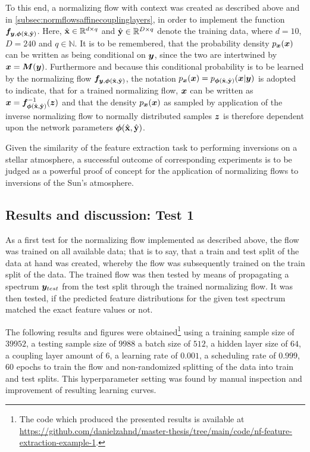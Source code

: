 \documentclass[a4paper,12pt]{report}
\begin{document}
To this end, a normalizing flow with context was created as described above and in \cref{subsec:normflowsaffinecouplinglayers}, in order to implement the function $\bm{f}_{\bm{y},\bm{\phi}(\hat{\boldsymbol{\mathbf{x}}},\hat{\boldsymbol{\mathbf{y}}})}$. Here, $\hat{\boldsymbol{\mathbf{x}}} \in \mathbb{R}^{d\times q}$ and $\hat{\boldsymbol{\mathbf{y}}} \in \mathbb{R}^{D\times q}$ denote the training data, where $d=10$, $D = 240$ and $q \in \mathbb{N}$. It is to be remembered, that the probability density $p_{\bm{x}}(\bm{x})$ can be written as being conditional on $\bm{y}$, since the two are intertwined by $\bm{x} = \bm{M}(\bm{y})$. Furthermore and because this conditional probability is to be learned by the normalizing flow $\bm{f}_{\bm{y},\bm{\phi}(\hat{\boldsymbol{\mathbf{x}}},\hat{\boldsymbol{\mathbf{y}}})}$, the notation $p_{\bm{x}}(\bm{x}) = p_{\bm{\phi}(\hat{\boldsymbol{\mathbf{x}}},\hat{\boldsymbol{\mathbf{y}}})}(\bm{x}|\bm{y})$ is adopted to indicate, that for a trained normalizing flow, $\bm{x}$ can be written as $\bm{x} = \bm{f}^{-1}_{\bm{\phi}(\hat{\boldsymbol{\mathbf{x}}},\hat{\boldsymbol{\mathbf{y}}})}(\bm{z})$ and that the density $p_{\bm{x}}(\bm{x})$ as sampled by application of the inverse normalizing flow to normally distributed samples $\bm{z}$ is therefore dependent upon the network parameters $\bm{\phi}(\hat{\boldsymbol{\mathbf{x}}},\hat{\boldsymbol{\mathbf{y}}})$.

Given the similarity of the feature extraction task to performing inversions on a stellar atmosphere, a successful outcome of corresponding experiments is to be judged as a powerful proof of concept for the application of normalizing flows to inversions of the Sun's atmosphere.

\subsection{Results and discussion: Test 1}\label{sec:feature-extraction-test-1}
As a first test for the normalizing flow implemented as described above, the flow was trained on all available data; that is to say, that a train and test split of the data at hand was created, whereby the flow was subsequently trained on the train split of the data. The trained flow was then tested by means of propagating a spectrum $\bm{y}_{test}$ from the test split through the trained normalizing flow. It was then tested, if the predicted feature distributions for the given test spectrum matched the exact feature values or not.

The following results and figures were obtained\footnote{The code which produced the presented results is available at \url{https://github.com/danielzahnd/master-thesis/tree/main/code/nf-feature-extraction-example-1}.} using a training sample size of $39952$, a testing sample size of $9988$ a batch size of $512$, a hidden layer size of $64$, a coupling layer amount of $6$, a learning rate of $0.001$, a scheduling rate of $0.999$, $60$ epochs to train the flow and non-randomized splitting of the data into train and test splits. This hyperparameter setting was found by manual inspection and improvement of resulting learning curves.
\end{document}
